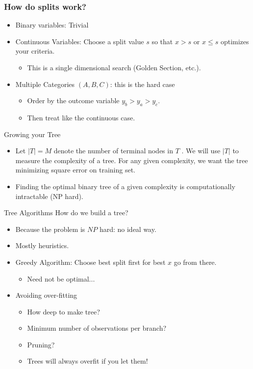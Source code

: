 \documentclass[xcolor=pdftex,dvipsnames,table,mathserif,aspectratio=169]{beamer}
\begin{document}
\begin{frame}
\frametitle{How do splits work?}
\begin{itemize}
\item Binary variables: Trivial
\item Continuous Variables: Choose a split value $s$ so that $x>s$ or $x\leq s$ optimizes your criteria.
\begin{itemize}
\item This is a single dimensional search (Golden Section, etc.).
\end{itemize}
\item Multiple Categories $(A,B,C)$: this is the hard case
\begin{itemize}
\item Order by the outcome variable $y_b > y_a > y_c$.
\item Then treat like the continuous case.
\end{itemize}
\end{itemize}
\end{frame}

\begin{frame}{Growing your Tree}
\begin{itemize}
\item Let $|T| = M$ denote the number of terminal nodes in $T$ . We will use $|T|$ to measure the complexity of a tree. For any given complexity,
we want the tree minimizing square error on training set.
\item Finding the optimal binary tree of a given complexity is computationally intractable (NP hard).
\end{itemize}
\end{frame}


\begin{frame}{Tree Algorithms}
How do we build a tree?
\begin{itemize}
\item Because the problem is $NP$ hard: no ideal way.
\item Mostly heuristics.
\item Greedy Algorithm: Choose best split first for best $x$ go from there.
\begin{itemize}
\item Need not be optimal...
\end{itemize}
\item Avoiding \alert{over-fitting}
\begin{itemize}
\item How deep to make tree?
\item Minimum number of observations per branch?
\item Pruning?
\item Trees will always overfit if you let them!
\end{itemize}
\end{itemize}
\end{frame}
\end{document}
